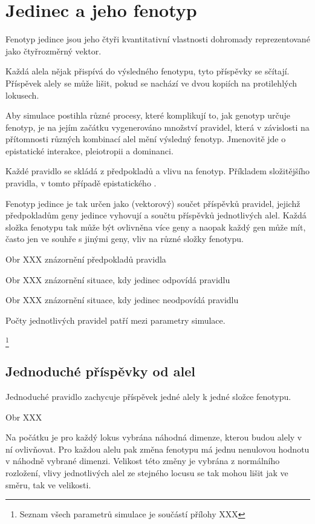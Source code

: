 \section{Jedinec a jeho fenotyp}

Fenotyp jedince jsou jeho čtyři kvantitativní vlastnosti dohromady reprezentované jako čtyřrozměrný vektor.

Každá alela nějak přispívá do výsledného fenotypu, tyto příspěvky se sčítají. Příspěvek alely se může lišit, pokud se
nachází ve dvou kopiích na protilehlých lokusech.

Aby simulace postihla různé procesy, které komplikují to, jak genotyp určuje fenotyp, je na jejím začátku
vygenerováno množství pravidel, která v závislosti na přítomnosti různých kombinací alel mění výsledný fenotyp.
Jmenovitě jde o epistatické interakce, pleiotropii a dominanci.

Každé pravidlo se skládá z předpokladů a vlivu na fenotyp. Příkladem složitějšího pravidla, v tomto případě
epistatického  .

Fenotyp jedince je tak určen jako (vektorový) součet příspěvků pravidel,
jejichž předpokladům geny jedince vyhovují a součtu příspěvků jednotlivých alel.
Každá složka fenotypu tak může být ovlivněna více geny a naopak každý gen může mít, často jen ve souhře s jinými geny,
vliv na různé složky fenotypu.

Obr XXX znázornění předpokladů pravidla

Obr XXX znázornění situace, kdy jedinec odpovídá pravidlu

Obr XXX znázornění situace, kdy jedinec neodpovídá pravidlu

Počty jednotlivých pravidel patří mezi parametry simulace.

\footnote{Seznam všech parametrů simulace je součástí přílohy XXX}

\subsection{Jednoduché příspěvky od alel}

Jednoduché pravidlo zachycuje příspěvek jedné alely k jedné složce fenotypu.

Obr XXX

Na počátku je pro každý lokus vybrána náhodná dimenze, kterou budou alely v ní ovlivňovat. Pro každou alelu pak změna
fenotypu má jednu nenulovou hodnotu v náhodně vybrané dimenzi. Velikost této změny je vybrána z normálního rozložení,
vlivy jednotlivých alel ze stejného locusu se tak mohou lišit jak ve směru, tak ve velikosti.

